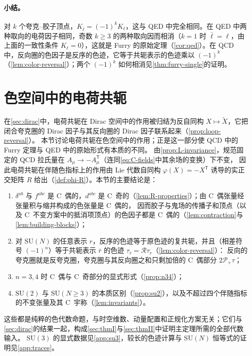 \documentclass[UTF8,a4paper,11pt,fontset=fandol]{ctexart}
\theoremstyle{cplain}
\theoremstyle{cdefinition}
\theoremstyle{cremark}
\numberwithin{equation}{section}
\newcommand{\tp}{\mathsf{T}}                         %
\newcommand{\Rop}{\mathcal{R}}                       %
\newcommand{\Pp}{\mathcal{P}_{+}}                    %
\newcommand{\Cconj}[1]{\widetilde{#1}}              %
\begin{document}
\paragraph{小结。}对 $k$ 个夸克--胶子顶点，$K_{\bar\ell}=(-1)^kK_\ell$，这与 QED 中完全相同。在 QED 中两种取向的电荷因子相同，奇数 $k\ge3$ 的两种取向因而相消（$k=1$ 时 $\bar\ell=\ell$，由上面的一致性条件 $K_\ell=0$），这就是 Furry 的原始定理\cite{Furry1937}（\cref{cor:qed}）。在 QCD 中，反向圈的色因子是反序的色迹，它等于共轭表示的色迹乘以 $(-1)^k$（\cref{lem:color-reversal}）；两个 $(-1)^k$ 如何相消见\cref{thm:furry-single}的证明。

\section{色空间中的电荷共轭}\label{sec:color}

在\cref{sec:dirac}中，电荷共轭在 Dirac 空间中的作用被归结为反自同构 $X\mapsto\Cconj X$，它把闭合夸克圈的 Dirac 因子与其反向圈的 Dirac 因子联系起来（\cref{prop:loop-reversal}）。
本节讨论电荷共轭在色空间中的作用；正是这一部分使 QCD 中的 Furry 定理与 QED 中的原始形式有本质的不同。
由\cref{prop:L-invariance}，规范固定的 QCD 拉氏量在 $A_\mu\to-A_\mu^{\tp}$（连同\cref{eq:C-fields}中其余场的变换）下不变，
因此电荷共轭在伴随色指标上的作用由 Lie 代数自同构 $\varphi(X)=-X^{\tp}$ 诱导的实正交矩阵 $R$ 给出（\cref{def:phi-R}）。本节的主要结论是：
\begin{enumerate}[label=(\arabic*),leftmargin=2.2em]
\item $\delta^{ab}$ 与 $f^{abc}$ 是 C~偶的，$d^{abc}$ 是 C~奇的（\cref{lem:R-properties}）；由 C~偶张量经张量积与缩并构成的色张量是 C~偶的，
因而胶子与鬼场的传播子和顶点（以及 C~不变方案中的抵消项顶点）的色因子都是 C~偶的（\cref{lem:contraction}与\cref{lem:building-blocks}）；
\item 对 $\mathrm{SU}(N)$ 的任意表示 $r$，反序的色迹等于原色迹的复共轭，并且（相差符号 $(-1)^n$）等于共轭表示 $\bar r$ 的色迹 $\tau_{\bar r}=\Rop\tau_r$（\cref{lem:color-reversal}）：
反向的夸克圈就是反夸克圈，夸克圈与其反向圈之和只剩加倍的 C~偶部分 $2\Pp\tau$；
\item $n=3,4$ 时 C~偶与 C~奇部分的显式形式（\cref{prop:n34}）；
\item $\mathrm{SU}(2)$ 与 $\mathrm{SU}(N\ge3)$ 的本质区别（\cref{prop:su2}），以及不超过四个伴随指标的不变张量及其 C~宇称（\cref{lem:invariants}）。
\end{enumerate}
这些都是纯粹的色代数命题，与时空维数、动量配置和正规化方案无关；它们与\cref{sec:dirac}的结果一起，构成\cref{sec:thmI}与\cref{sec:thmII}中证明主定理所需的全部代数输入。
$\mathrm{SU}(3)$ 的显式数据见\cref{app:su3}，较长的色迹计算与 $\mathrm{SU}(N)$ 恒等式的证明见\cref{app:traces}。
\end{document}
